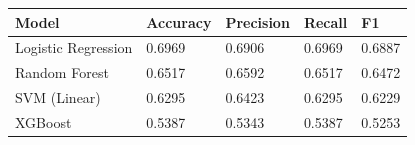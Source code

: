 \begin{tabular}{lllll}
\toprule
Model & Accuracy & Precision & Recall & F1 \\
\midrule
Logistic Regression & 0.6969 & 0.6906 & 0.6969 & 0.6887 \\
Random Forest & 0.6517 & 0.6592 & 0.6517 & 0.6472 \\
SVM (Linear) & 0.6295 & 0.6423 & 0.6295 & 0.6229 \\
XGBoost & 0.5387 & 0.5343 & 0.5387 & 0.5253 \\
\bottomrule
\end{tabular}
